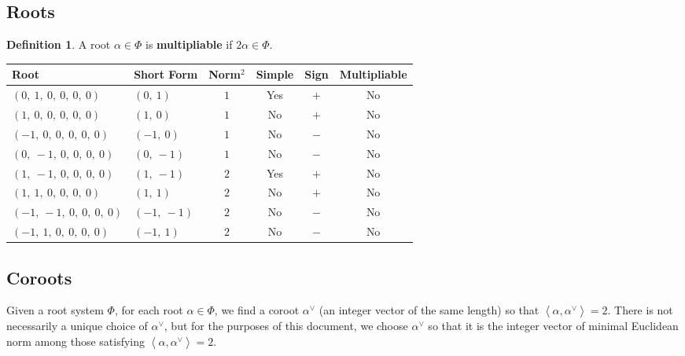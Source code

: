 \documentclass[11pt]{article}
\newcommand{\noi}{\noindent}
\newcommand{\tbf}{\textbf}
\newcommand{\la}{\left\langle}
\newcommand{\ra}{\right\rangle}
\theoremstyle{definition}
\newtheorem{definition}{Definition}[section]
\begin{document}
\subsection{Roots}

\begin{definition}
A root $\alpha \in \Phi$ is \tbf{multipliable} if $2\alpha \in \Phi$.
\end{definition}

\noi \begin{tabular}{|l|l|c|c|c|c|}
    \hline
    \textbf{Root} & \textbf{Short Form} & \textbf{Norm$^2$} & \textbf{Simple} & \textbf{Sign} & \textbf{Multipliable} \\
    \hline
    $\left( 0, \  1, \  0, \  0, \  0, \  0\right)$ & $\left( 0, \  1\right)$ & $1$ & Yes & $+$ & No \\
    \hline
    $\left( 1, \  0, \  0, \  0, \  0, \  0\right)$ & $\left( 1, \  0\right)$ & $1$ & No & $+$ & No \\
    \hline
    $\left( -1, \  0, \  0, \  0, \  0, \  0\right)$ & $\left( -1, \  0\right)$ & $1$ & No & $-$ & No \\
    \hline
    $\left( 0, \  -1, \  0, \  0, \  0, \  0\right)$ & $\left( 0, \  -1\right)$ & $1$ & No & $-$ & No \\
    \hline
    $\left( 1, \  -1, \  0, \  0, \  0, \  0\right)$ & $\left( 1, \  -1\right)$ & $2$ & Yes & $+$ & No \\
    \hline
    $\left( 1, \  1, \  0, \  0, \  0, \  0\right)$ & $\left( 1, \  1\right)$ & $2$ & No & $+$ & No \\
    \hline
    $\left( -1, \  -1, \  0, \  0, \  0, \  0\right)$ & $\left( -1, \  -1\right)$ & $2$ & No & $-$ & No \\
    \hline
    $\left( -1, \  1, \  0, \  0, \  0, \  0\right)$ & $\left( -1, \  1\right)$ & $2$ & No & $-$ & No \\
    \hline
\end{tabular}


\subsection{Coroots}

Given a root system $\Phi$, for each root $\alpha \in \Phi$, we find a coroot $\alpha^\vee$ (an integer vector of the same length) so that $\la \alpha, \alpha^\vee \ra = 2$. There is not necessarily a unique choice of $\alpha^\vee$, but for the purposes of this document, we choose $\alpha^\vee$ so that it is the integer vector of minimal Euclidean norm among those satisfying $\la \alpha, \alpha^\vee \ra = 2$.
\end{document}
